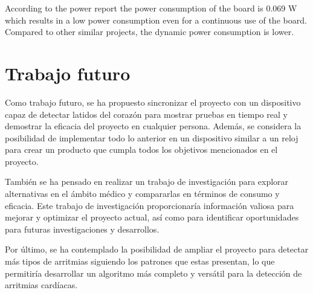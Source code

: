 According to the power report the power consumption of the board is 0.069 W which results in a low power consumption even for a continuous use of the board.
Compared to other similar projects, the dynamic power consumption is lower.


\chapter*{Trabajo futuro}

Como trabajo futuro, se ha propuesto sincronizar el proyecto con un dispositivo capaz de detectar latidos del corazón para mostrar pruebas en tiempo real y demostrar la eficacia del proyecto en cualquier persona. Además, se considera la posibilidad de implementar todo lo anterior en un dispositivo similar a un reloj para crear un producto que cumpla todos los objetivos mencionados en el proyecto.

También se ha pensado en realizar un trabajo de investigación para explorar alternativas en el ámbito médico y compararlas en términos de consumo y eficacia. Este trabajo de investigación proporcionaría información valiosa para mejorar y optimizar el proyecto actual, así como para identificar oportunidades para futuras investigaciones y desarrollos.

Por último, se ha contemplado la posibilidad de ampliar el proyecto para detectar más tipos de arritmias siguiendo los patrones que estas presentan, lo que permitiría desarrollar un algoritmo más completo y versátil para la detección de arritmias cardíacas.
